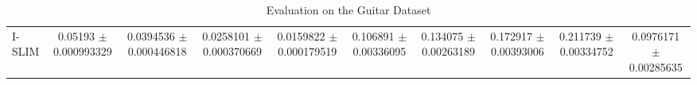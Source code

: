 \begin{table*}
{\begin{tabular}{l|cccc|cccc|c}


		I-SLIM &\num{0.05193} $\pm$ \num{0.000993329}&\num{0.0394536} $\pm$ \num{0.000446818}&\num{0.0258101} $\pm$ \num{0.000370669}&\num{0.0159822} $\pm$ \num{0.000179519}&\num{0.106891} $\pm$ \num{0.00336095}&\num{0.134075} $\pm$ \num{0.00263189}&\num{0.172917} $\pm$ \num{0.00393006}&\num{0.211739} $\pm$ \num{0.00334752}&\num{0.0976171} $\pm$ \num{0.00285635}\\
		


	\end{tabular}
}
	\caption{Evaluation on the Guitar Dataset}
\end{table*}


